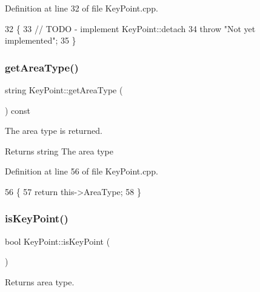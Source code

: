 Definition at line 32 of file Key\+Point.\+cpp.


\begin{DoxyCode}
32                                               \{
33     \textcolor{comment}{// TODO - implement KeyPoint::detach}
34     \textcolor{keywordflow}{throw} \textcolor{stringliteral}{"Not yet implemented"};
35 \}
\end{DoxyCode}
\mbox{\label{classKeyPoint_a2e7f0accc7c9be244da25bb1189c5a1d}} 
\subsubsection{\texorpdfstring{get\+Area\+Type()}{getAreaType()}}
{\footnotesize\ttfamily string Key\+Point\+::get\+Area\+Type (\begin{DoxyParamCaption}{ }\end{DoxyParamCaption}) const}



The area type is returned. 

\begin{DoxyReturn}{Returns}
string The area type 
\end{DoxyReturn}


Definition at line 56 of file Key\+Point.\+cpp.


\begin{DoxyCode}
56                                   \{
57     \textcolor{keywordflow}{return} this->AreaType;
58 \}
\end{DoxyCode}
\mbox{\label{classKeyPoint_a1beb436d8efa973f3dc290a722727961}} 
\subsubsection{\texorpdfstring{is\+Key\+Point()}{isKeyPoint()}}
{\footnotesize\ttfamily bool Key\+Point\+::is\+Key\+Point (\begin{DoxyParamCaption}{ }\end{DoxyParamCaption})\hspace{0.3cm}{\ttfamily [virtual]}}



Returns area type. 

